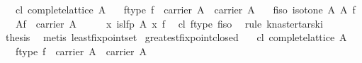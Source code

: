 \begin{isabellebody}
\ \ \ cl{}\ {}complete{}lattice\ A{}\isanewline
\ \ \ f{}type{}\ {}f\ {}\ carrier\ A\ {}\ carrier\ A{}\isanewline
\ \ \ f{}iso{}\ {}isotone\ A\ A\ f{}\isanewline
\ \ \ {}{}\isactrlbsub A\isactrlesub f\ {}\ carrier\ A{}\isanewline
%
\isadelimproof
%
\endisadelimproof
%
\isatagproof
{}\isamarkupfalse%
\ {}\isanewline
\ \ \isamarkupfalse%
\ {}{}{}x{}\ is{}lfp\ A\ x\ f{}\ \isamarkupfalse%
\ cl\ f{}type\ f{}iso\ \isamarkupfalse%
\ {}rule\ knaster{}tarski{}\isanewline
\ \ \isamarkupfalse%
\ {}thesis\ \isamarkupfalse%
\ {}metis\ least{}fixpoint{}set{}\isanewline
{}\isamarkupfalse%
%
\endisatagproof
{\isafoldproof}%
%
\isadelimproof
\isanewline
%
\endisadelimproof
\isanewline
{}\isamarkupfalse%
\ greatest{}fixpoint{}closed{}\isanewline
\ \ \ cl{}\ {}complete{}lattice\ A{}\isanewline
\ \ \ f{}type{}\ {}f\ {}\ carrier\ A\ {}\ carrier\ A{}\isanewline

\end{isabellebody}
